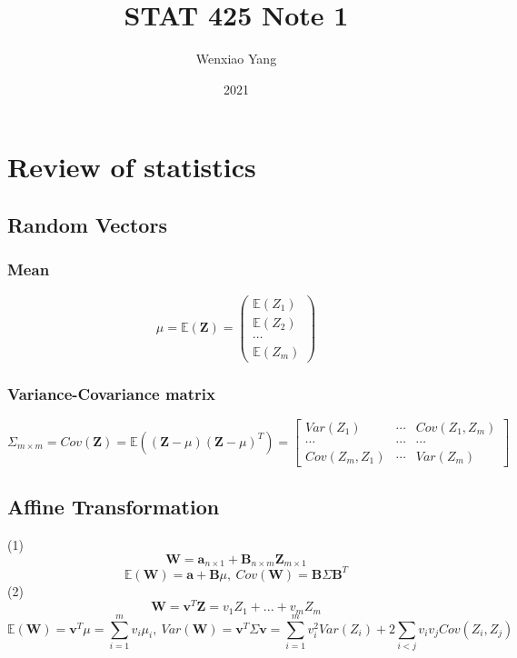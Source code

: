 \documentclass[11pt,a4paper]{article}
\title{STAT 425 Note 1}
\author[*]{Wenxiao Yang}
\affil[*]{Department of Mathematics, University of Illinois at Urbana-Champaign}
\date{2021}
\begin{document}
\maketitle
\tableofcontents
\newpage


\section{Review of statistics}
\subsection{Random Vectors}
\subsubsection{Mean}
$$\mu =\mathbb{E}(\mathbf{Z})=\begin{pmatrix}
    \mathbb{E}(Z_1)\\
    \mathbb{E}(Z_2)\\
    \cdots\\
    \mathbb{E}(Z_m)
\end{pmatrix}$$
\subsubsection{Variance-Covariance matrix}
$$\Sigma_{m\times m}=Cov(\mathbf{Z})=\mathbb{E}((\mathbf{Z}-\mu)(\mathbf{Z}-\mu)^T)=\begin{bmatrix}
    Var(Z_1)&\cdots	&Cov(Z_1,Z_m)\\
    \cdots&\cdots	&\cdots\\
    Cov(Z_m,Z_1)&\cdots &Var(Z_m)
\end{bmatrix}$$
\subsection{Aﬃne Transformation}
(1)
$$\mathbf{W}=\mathbf{a}_{n\times 1}+\mathbf{B}_{n\times m}\mathbf{Z}_{m\times 1}$$
$$\mathbb{E}(\mathbf{W})=\mathbf{a}+\mathbf{B}\mu,\ Cov(\mathbf{W})=\mathbf{B}\Sigma \mathbf{B}^T$$
(2)
$$\mathbf{W}=\mathbf{v}^T \mathbf{Z}=v_1Z_1+...+v_mZ_m$$
$$\mathbb{E}(\mathbf{W})=\mathbf{v}^T\mu=\sum_{i=1}^mv_i\mu_i,\ Var(\mathbf{W})=\mathbf{v}^T\Sigma \mathbf{v}=\sum_{i=1}^mv_i^2Var(Z_i)+2\sum_{i<j}v_iv_jCov(Z_i,Z_j)$$
\end{document}
